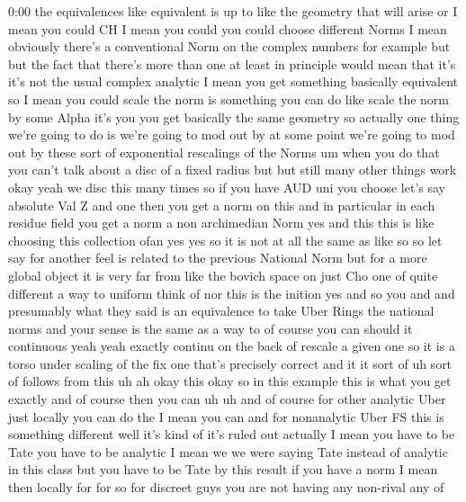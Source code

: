 \begin{unfinished}{0:00}
the  equivalences  like  equivalent  is  up
to  like  the  geometry  that  will  arise
or  I  mean  you  could  CH  I
mean  you  could  you  could  choose
different  Norms  I  mean  obviously  there's
a  conventional  Norm  on  the  complex
numbers  for  example
but  but  the  fact  that  there's  more  than
one  at  least  in  principle  would  mean
that  it's  it's  not  the  usual  complex
analytic  I  mean  you  get  something
basically  equivalent  so  I  mean  you  could
scale  the  norm  is  something  you  can  do
like  scale  the  norm  by  some  Alpha  it's
you  you  get  basically  the  same  geometry
so  actually  one  thing  we're  going  to  do
is  we're  going  to  mod  out  by  at  some
point  we're  going  to  mod  out  by  these
sort  of  exponential  rescalings  of  the
Norms  um  when  you  do  that  you  can't  talk
about  a  disc  of  a  fixed  radius
but  but  still  many  other  things  work
okay  yeah  we  disc  this  many  times  so  if
you  have  AUD  uni  you  choose  let's  say
absolute  Val  Z  and  one  then  you  get  a
norm  on  this  and  in  particular  in  each
residue  field  you  get  a  norm  a  non
archimedian  Norm  yes  and  this  this  is
like  choosing  this  collection  ofan  yes
yes  so  it  is  not  at  all  the  same  as  like
so  so  let  say  for  another  feel  is
related  to  the  previous  National  Norm
but  for  a  more  global  object  it  is  very
far  from  like  the  bovich  space  on  just
Cho  one  of  quite  different  a  way  to
uniform  think  of  nor  this  is  the  inition
yes  and  so  you  and  and  presumably  what
they  said  is  an  equivalence  to  take  Uber
Rings  the  national  norms  and  your  sense
is  the  same  as  a  way  to  of  course  you
can  should  it  continuous  yeah  yeah
exactly  continu  on  the  back  of  rescale  a
given  one  so  it  is  a  torso  under  scaling
of  the  fix  one  that's  precisely  correct
and  it  it  sort  of  uh  sort  of  follows
from  this  uh  ah  okay  this  okay  so  in
this  example  this  is  what  you  get
exactly  and  of  course  then  you  can  uh  uh
and  of  course  for  other  analytic  Uber
just  locally  you  can  do  the  I  mean  you
can  and  for  nonanalytic  Uber
FS  this  is  something  different  well  it's
kind  of  it's  ruled  out  actually  I  mean
you  have  to  be  Tate  you  have  to  be
analytic  I  mean  we  we  were  saying  Tate
instead  of  analytic  in  this  class  but
you  have  to  be  Tate  by  this  result  if
you  have  a  norm  I  mean  then
locally  for  for  so  for  discreet  guys  you
are  not  having  any  non-rival  any  of

\end{unfinished}
